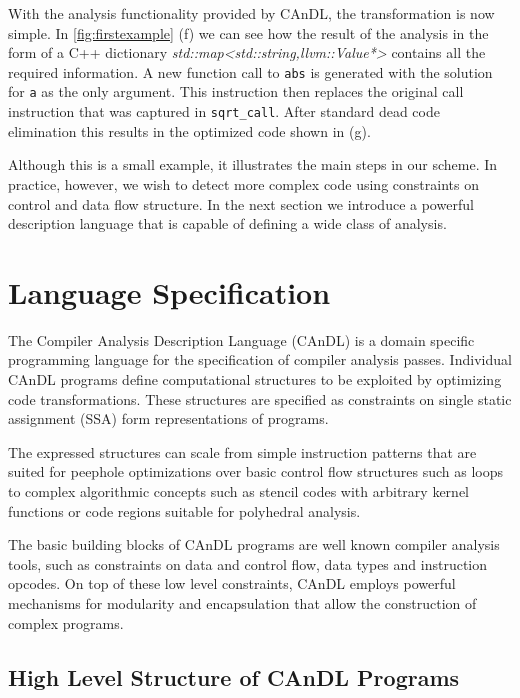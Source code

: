     With the analysis functionality provided by CAnDL, the transformation is now
    simple.
    In \autoref{fig:firstexample} (f) we can see how the result of the analysis
    in the form of a C++ dictionary {\it std::map<std::string,llvm::Value*>}
    contains all the required information.
    A new function call to {\tt abs} is generated with the solution for {\tt a}
    as the only argument.
    This instruction then replaces the original call instruction that was
    captured in {\tt sqrt\_call}.
    After standard dead code elimination this results in the optimized code
    shown in (g).


    Although this is a small example, it illustrates the main steps in our
    scheme.
    In practice, however, we wish to detect more complex code using constraints
    on control and data flow structure.
    In the next section we introduce a powerful description language that is
    capable of defining a wide class of analysis.

\section{Language Specification}

    The Compiler Analysis Description Language (CAnDL) is a domain specific
    programming language for the specification of compiler analysis
    passes. 
    Individual CAnDL programs define computational structures to be exploited by
    optimizing code transformations.
    These structures are specified as constraints on single static assignment
    (SSA) form representations of programs.

    The expressed structures can scale from simple instruction patterns that are
    suited for peephole optimizations over basic control flow structures such as
    loops to complex algorithmic concepts such as stencil codes with arbitrary
    kernel functions or code regions suitable for polyhedral analysis.

    The basic building blocks of CAnDL programs are well known compiler analysis
    tools, such as constraints on data and control flow, data types and
    instruction opcodes.
    On top of these low level constraints, CAnDL employs powerful mechanisms for
    modularity and encapsulation that allow the construction of complex
    programs.

\subsection{High Level Structure of CAnDL Programs}

